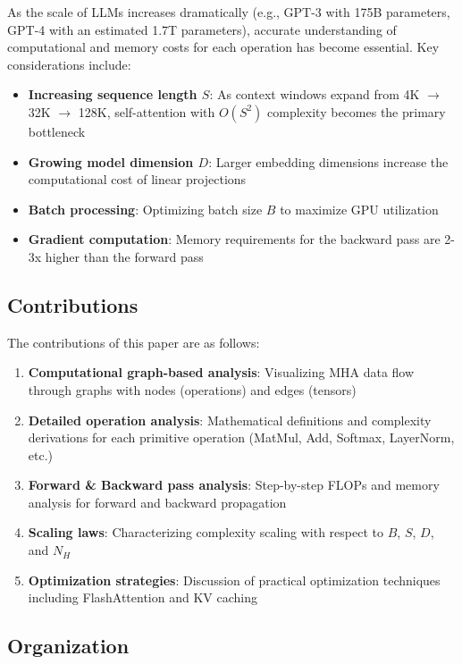 \documentclass[10pt]{article}
\begin{document}
As the scale of LLMs increases dramatically (e.g., GPT-3 with 175B parameters, GPT-4 with an estimated 1.7T parameters), accurate understanding of computational and memory costs for each operation has become essential. Key considerations include:

\begin{itemize}
  \item \textbf{Increasing sequence length $S$}: As context windows expand from 4K $\rightarrow$ 32K $\rightarrow$ 128K, self-attention with $O(S^2)$ complexity becomes the primary bottleneck
  \item \textbf{Growing model dimension $D$}: Larger embedding dimensions increase the computational cost of linear projections
  \item \textbf{Batch processing}: Optimizing batch size $B$ to maximize GPU utilization
  \item \textbf{Gradient computation}: Memory requirements for the backward pass are 2-3x higher than the forward pass
\end{itemize}

\subsection{Contributions}

The contributions of this paper are as follows:

\begin{enumerate}
  \item \textbf{Computational graph-based analysis}: Visualizing MHA data flow through graphs with nodes (operations) and edges (tensors)
  \item \textbf{Detailed operation analysis}: Mathematical definitions and complexity derivations for each primitive operation (MatMul, Add, Softmax, LayerNorm, etc.)
  \item \textbf{Forward \& Backward pass analysis}: Step-by-step FLOPs and memory analysis for forward and backward propagation
  \item \textbf{Scaling laws}: Characterizing complexity scaling with respect to $B$, $S$, $D$, and $N_H$
  \item \textbf{Optimization strategies}: Discussion of practical optimization techniques including FlashAttention and KV caching
\end{enumerate}

\subsection{Organization}
\end{document}
